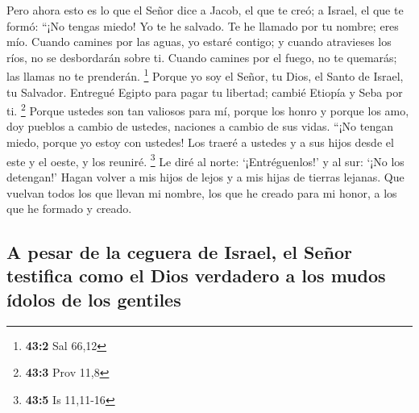  Pero ahora esto es lo que el Señor dice a Jacob, el que
te creó; a Israel, el que te formó: ``¡No tengas miedo! Yo te he
salvado. Te he llamado por tu nombre; eres mío.  Cuando
camines por las aguas, yo estaré contigo; y cuando atravieses los ríos,
no se desbordarán sobre ti. Cuando camines por el fuego, no te quemarás;
las llamas no te prenderán. \footnote{\textbf{43:2} Sal 66,12}
 Porque yo soy el Señor, tu Dios, el Santo de Israel, tu
Salvador. Entregué Egipto para pagar tu libertad; cambié Etiopía y Seba
por ti. \footnote{\textbf{43:3} Prov 11,8}  Porque ustedes
son tan valiosos para mí, porque los honro y porque los amo, doy pueblos
a cambio de ustedes, naciones a cambio de sus vidas. 
``¡No tengan miedo, porque yo estoy con ustedes! Los traeré a ustedes y
a sus hijos desde el este y el oeste, y los reuniré. \footnote{\textbf{43:5}
  Is 11,11-16}  Le diré al norte: `¡Entréguenlos!' y al
sur: `¡No los detengan!' Hagan volver a mis hijos de lejos y a mis hijas
de tierras lejanas.  Que vuelvan todos los que llevan mi
nombre, los que he creado para mi honor, a los que he formado y creado.

\hypertarget{a-pesar-de-la-ceguera-de-israel-el-seuxf1or-testifica-como-el-dios-verdadero-a-los-mudos-uxeddolos-de-los-gentiles}{%
\subsection{A pesar de la ceguera de Israel, el Señor testifica como el
Dios verdadero a los mudos ídolos de los
gentiles}\label{a-pesar-de-la-ceguera-de-israel-el-seuxf1or-testifica-como-el-dios-verdadero-a-los-mudos-uxeddolos-de-los-gentiles}}

